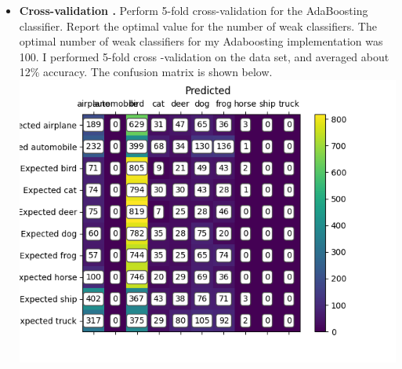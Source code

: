 \documentclass[11pt]{article}
\begin{document}
\begin{itemize}
        \item \textbf{Cross-validation .} Perform 5-fold cross-validation for the AdaBoosting classifier.
        Report the optimal value for the number of weak classifiers.\newline
        The optimal number of weak classifiers for my Adaboosting implementation was 100. I performed 5-fold cross
        -validation on the data set, and averaged about 12\% accuracy. The confusion matrix is
        shown below.\newline
        \includegraphics[width=\textwidth]{Output Pictures/Confusion Matrix AdaBoost}
    \end{itemize}
\end{document}
